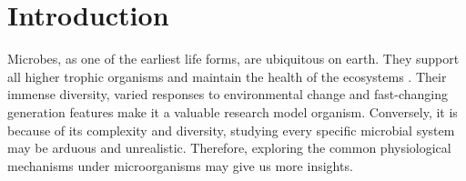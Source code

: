 \documentclass[a4paper]{article}
\begin{document}
\section{Introduction}

Microbes, as one of the earliest life forms, are ubiquitous on earth. They support all higher trophic organisms and maintain the health of the ecosystems \citep{whitman1998prokaryotes}. Their immense diversity, varied responses to environmental change and fast-changing generation features make it a valuable research model organism. Conversely, it is because of its complexity and diversity, studying every specific microbial system may be arduous and unrealistic. Therefore, exploring the common physiological mechanisms under microorganisms may give us more insights.\\
\end{document}
